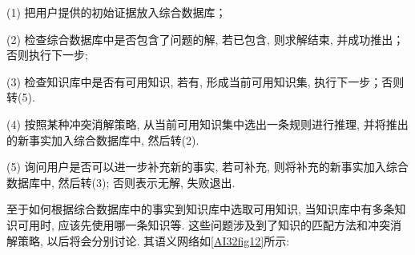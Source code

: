 (1) 把用户提供的初始证据放入综合数据库；

(2) 检查综合数据库中是否包含了问题的解, 若已包含, 则求解结束, 并成功推出；否则执行下一步;

(3) 检查知识库中是否有可用知识, 若有, 形成当前可用知识集, 执行下一步；否则转(5).

(4) 按照某种冲突消解策略, 从当前可用知识集中选出一条规则进行推理, 并将推出的新事实加入综合数据库中, 然后转(2).

(5) 询问用户是否可以进一步补充新的事实, 若可补充, 则将补充的新事实加入综合数据库中, 然后转(3); 否则表示无解, 失败退出.

至于如何根据综合数据库中的事实到知识库中选取可用知识, 当知识库中有多条知识可用时, 应该先使用哪一条知识等. 这些问题涉及到了知识的匹配方法和冲突消解策略, 以后将会分别讨论.
其语义网络如\ref{AI32fig12}所示:
